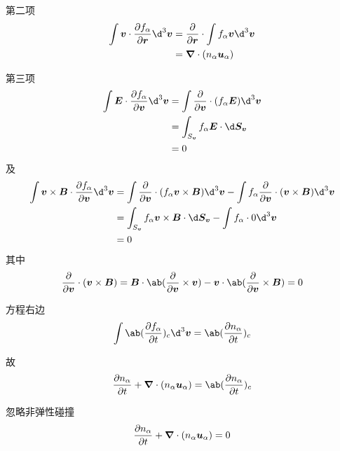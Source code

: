 第二项
\begin{equation}\begin{aligned}
    \int \vec{v} \cdot \pdv{f_\alpha}{\vec{r}} \d^3 \vec{v}
    &= \pdv{}{\vec{r}} \cdot \int f_\alpha \vec{v} \d^3 \vec{v} \\
    &= \dive{(n_\alpha \vec{u}_\alpha)}
\end{aligned}\end{equation}

第三项
\begin{equation}\begin{aligned}
    \int \vec{E} \cdot \pdv{f_\alpha}{\vec{v}} \d^3 \vec{v}
    &= \int \pdv{}{\vec{v}} \cdot (f_\alpha \vec{E}) \d^3 \vec{v} \\
    &= \int_{S_{\vec{v}}} f_\alpha \vec{E} \cdot \d \vec{S}_{\vec{v}} \\
    &= 0
\end{aligned}\end{equation}
及
\begin{equation}\begin{aligned}
    \int \vec{v} \times \vec{B} \cdot \pdv{f_\alpha}{\vec{v}} \d^3 \vec{v}
    &= \int \pdv{}{\vec{v}} \cdot (f_\alpha \vec{v} \times \vec{B}) \d^3 \vec{v}
    - \int f_\alpha \pdv{}{\vec{v}} \cdot (\vec{v} \times \vec{B}) \d^3 \vec{v} \\
    &= \int_{S_{\vec{v}}} f_\alpha \vec{v} \times \vec{B} \cdot \d \vec{S}_{\vec{v}}
    - \int f_\alpha \cdot 0 \d^3 \vec{v} \\
    &= 0
\end{aligned}\end{equation}
其中
\begin{equation}
    \pdv{}{\vec{v}} \cdot (\vec{v} \times \vec{B})
    = \vec{B} \cdot \ab( \pdv{}{\vec{v}} \times \vec{v} )
    - \vec{v} \cdot \ab( \pdv{}{\vec{v}} \times \vec{B} )
    = 0
\end{equation}

方程右边
\begin{equation}
    \int \ab( \pdv{f_\alpha}{t} )_c \d^3 \vec{v} = \ab( \pdv{n_\alpha}{t} )_c
\end{equation}

故
\begin{equation}
    \pdv{n_\alpha}{t} + \dive{(n_\alpha \vec{u}_\alpha)} = \ab( \pdv{n_\alpha}{t} )_c
\end{equation}

忽略非弹性碰撞
\begin{equation}\label{eq:Fluid_连续性方程}
    \pdv{n_\alpha}{t} + \bm{\nabla} \cdot{(n_\alpha \bm{u}_\alpha)} = 0
\end{equation}

